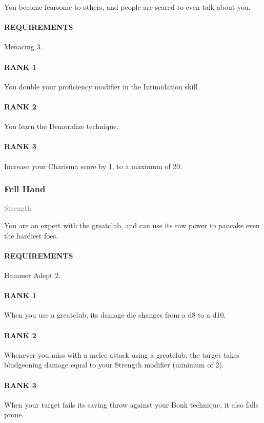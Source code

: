 \normalsize
You become fearsome to others, and people are scared to even talk about you.
\paragraph{REQUIREMENTS} Menacing 3.
\paragraph{RANK 1} You double your proficiency modifier in the Intimidation skill.
\paragraph{RANK 2} You learn the Demoralize technique.
\paragraph{RANK 3} Increase your Charisma score by 1, to a maximum of 20.

\subsubsection{Fell Hand} \label{tal::fellhand}
\small{\textcolor{gray}{Strength}}

\normalsize
You are an expert with the greatclub, and can use its raw power to pancake even the hardiest foes.
\paragraph{REQUIREMENTS} Hammer Adept 2.
\paragraph{RANK 1} When you use a greatclub, its damage die changes from a d8 to a d10.
\paragraph{RANK 2} Whenever you miss with a melee attack using a greatclub, the target takes bludgeoning damage equal to your Strength modifier (minimum of 2).
\paragraph{RANK 3} When your target fails its saving throw against your Bonk technique, it also falls prone.

